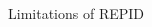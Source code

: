 \documentclass[11pt,compress,t,notes=noshow, aspectratio=169, xcolor=table,dvipsnames]{beamer}
\newcommand{\highlightICE}[1]{\colorbox{cice}{$\displaystyle #1$}}
\newcommand{\highlight}[1]{\colorbox{orange}{$\displaystyle #1$}}
\begin{document}
\begin{frame}{Limitations of REPID}
\begin{columns}[T, totalwidth = \textwidth]
{\begin{column}{0.52\textwidth}
\begin{columns}[T, totalwidth = \linewidth]
\begin{column}{0.025\linewidth}
         \end{column}
     \end{columns}
    \end{column}
}


\end{columns}
\end{frame}
\end{document}
